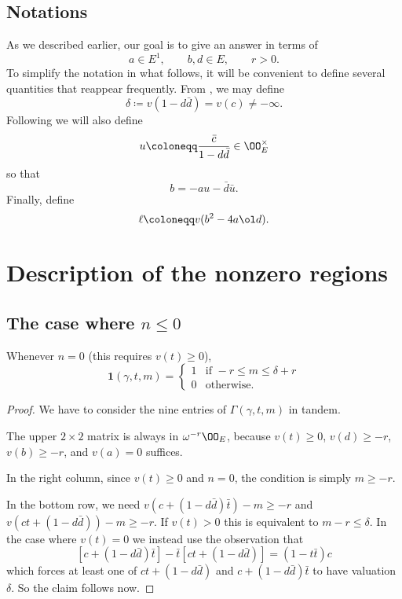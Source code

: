 \subsection{Notations}
As we described earlier, our goal is to give an answer in terms of
\[ a \in E^1, \qquad b, d \in E, \qquad r > 0. \]
To simplify the notation in what follows,
it will be convenient to define several quantities that reappear frequently.
From , we may define
\begin{equation}
  \delta \coloneqq v(1-d \bar d) = v(c) \neq -\infty.
  \label{eq:delta}
\end{equation}
Following \cite{ref:AFL} we will also define
\begin{equation}
  u \coloneqq \frac{\bar c}{1-d \bar d} \in \OO_E^\times
  \label{eq:u}
\end{equation}
so that
\begin{equation}
  b = -au - \bar{d} \bar{u}.
  \label{eq:b}
\end{equation}
Finally, define
\begin{equation}
  \ell \coloneqq v(b^2 - 4 a \ol d).
  \label{eq:ell}
\end{equation}

\section{Description of the nonzero regions}
\subsection{The case where $n \leq 0$}
\begin{claim}
  Whenever $n = 0$ (this requires $v(t) \geq 0$),
  \[
    \mathbf{1}(\gamma, t, m) =
    \begin{cases}
      1 & \text{if } -r \le m \le \delta+r \\
      0 & \text{otherwise.}
    \end{cases}
  \]
\end{claim}
\begin{proof}
  We have to consider the nine entries of $\Gamma(\gamma, t, m)$ in tandem.

  The upper $2 \times 2$ matrix is always in $\omega^{-r}\OO_E$,
  because $v(t) \geq 0$, $v(d) \geq -r$, $v(b) \geq -r$, and $v(a) = 0$ suffices.

  In the right column, since $v(t) \geq 0$ and $n = 0$, the condition is simply $m \ge -r$.

  In the bottom row, we need
  $v\left( c+(1-d\bar d) \bar t \right)-m \geq -r$
  and $v\left( ct +(1-d\bar d) \right)-m \geq -r$.
  If $v(t) > 0$ this is equivalent to $m-r \leq \delta$.
  In the case where $v(t) = 0$ we instead use the observation that
  \begin{equation}
    \left[ c + (1-d \bar d) \bar t \right]
    - \bar t \left[ ct + (1-d \bar d) \right] = (1-t\bar t) c
    \label{eq:ctrick}
  \end{equation}
  which forces at least one of $ct + (1-d \bar d)$ and $c + (1-d \bar d) \bar t$ to
  have valuation $\delta$. So the claim follows now.
\end{proof}

